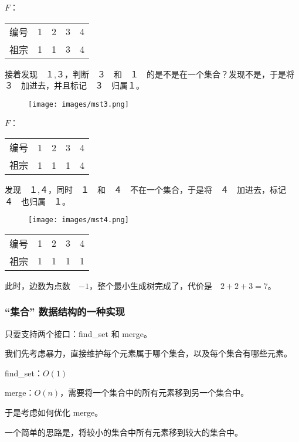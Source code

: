 $F$：

\begin{tabular}{rrrrr}
\hline
编号& 1& 2& 3& 4\\祖宗& 1& 1& 3& 4\\\hline
\end{tabular}

接着发现　１,３，判断　３　和　１　的是不是在一个集合？发现不是，于是将　３　加进去，并且标记　３　归属１。

\begin{figure}[h]
\centering
\texttt{[image: images/mst3.png]} 

\end{figure}

$F$：

\begin{tabular}{rrrrr}
\hline
编号& 1& 2& 3& 4\\祖宗& 1& 1& 1& 4\\\hline
\end{tabular}

发现　１,４，同时　１　和　４　不在一个集合，于是将　４　加进去，标记　４　也归属　１。

\begin{figure}[h]
\centering
\texttt{[image: images/mst4.png]} 

\end{figure}

\begin{tabular}{rrrrr}
\hline
编号& 1& 2& 3& 4\\祖宗& 1& 1& 1& 1\\\hline
\end{tabular}

此时，边数为点数　$-1$，整个最小生成树完成了，代价是　$2+2+3=7$。

\subsubsection{“集合” 数据结构的一种实现}

只要支持两个接口：find\_set 和 merge。

我们先考虑暴力，直接维护每个元素属于哪个集合，以及每个集合有哪些元素。

find\_set：$O(1)$

merge：$O(n)$，需要将一个集合中的所有元素移到另一个集合中。

于是考虑如何优化 merge。

一个简单的思路是，将较小的集合中所有元素移到较大的集合中。

